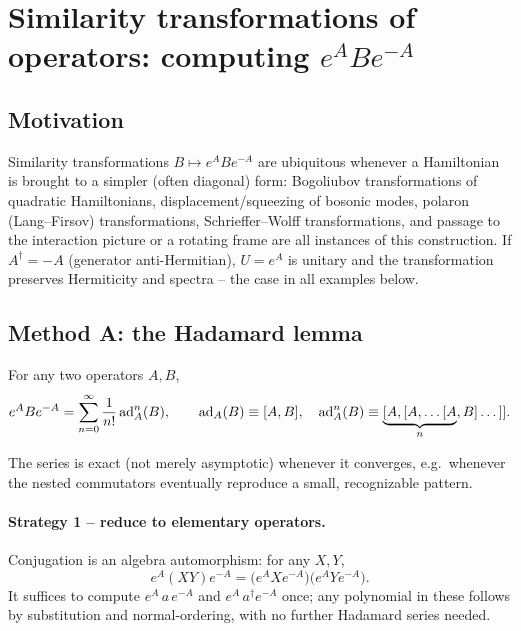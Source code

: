 \documentclass[../main.tex]{subfiles}
\begin{document}
\section{Similarity transformations of operators: computing \texorpdfstring{$e^{A}Be^{-A}$}{eABe-A}}
\label{sec:similarity-transformations}

\subsection{Motivation}

Similarity transformations $B\mapsto e^{A}Be^{-A}$ are ubiquitous whenever a Hamiltonian is
brought to a simpler (often diagonal) form: Bogoliubov transformations of quadratic
Hamiltonians, displacement/squeezing of bosonic modes, polaron (Lang--Firsov)
transformations, Schrieffer--Wolff transformations, and passage to the interaction
picture or a rotating frame are all instances of this construction. If $A^\dagger=-A$
(generator anti-Hermitian), $U=e^{A}$ is unitary and the transformation preserves
Hermiticity and spectra -- the case in all examples below.

\subsection{Method A: the Hadamard lemma}

\begin{lemma*}
For any two operators $A,B$,
\begin{equation}
e^{A}Be^{-A}=\sum_{n=0}^{\infty}\frac{1}{n!}\,\mathrm{ad}_A^n(B),\qquad
\mathrm{ad}_A(B)\equiv[A,B],\quad \mathrm{ad}_A^n(B)\equiv\underbrace{[A,[A,\dots[A}_{n},B]\dots]].
\end{equation}
\end{lemma*}

The series is exact (not merely asymptotic) whenever it converges, e.g.\ whenever the
nested commutators eventually reproduce a small, recognizable pattern.

\paragraph{Strategy 1 -- reduce to elementary operators.}
Conjugation is an algebra automorphism: for any $X,Y$,
\begin{equation}
e^{A}(XY)e^{-A}=\big(e^{A}Xe^{-A}\big)\big(e^{A}Ye^{-A}\big).
\end{equation}
It suffices to compute $e^{A}\,a\,e^{-A}$ and $e^{A}\,a^\dagger e^{-A}$ once; any
polynomial in these follows by substitution and normal-ordering, with no further
Hadamard series needed.
\end{document}

